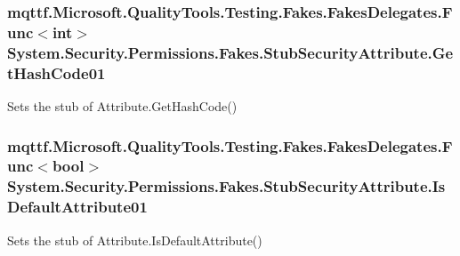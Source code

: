 \hypertarget{class_system_1_1_security_1_1_permissions_1_1_fakes_1_1_stub_security_attribute_a25960f180eac8b4bc3a213422d990975}{
\subsubsection[{Get\-Hash\-Code01}]{\setlength{\rightskip}{0pt plus 5cm}mqttf.\-Microsoft.\-Quality\-Tools.\-Testing.\-Fakes.\-Fakes\-Delegates.\-Func$<$int$>$ System.\-Security.\-Permissions.\-Fakes.\-Stub\-Security\-Attribute.\-Get\-Hash\-Code01}}\label{class_system_1_1_security_1_1_permissions_1_1_fakes_1_1_stub_security_attribute_a25960f180eac8b4bc3a213422d990975}


Sets the stub of Attribute.\-Get\-Hash\-Code()

\hypertarget{class_system_1_1_security_1_1_permissions_1_1_fakes_1_1_stub_security_attribute_a6dbdb946d459fad9a2d0c2ef800268ab}{
\subsubsection[{Is\-Default\-Attribute01}]{\setlength{\rightskip}{0pt plus 5cm}mqttf.\-Microsoft.\-Quality\-Tools.\-Testing.\-Fakes.\-Fakes\-Delegates.\-Func$<$bool$>$ System.\-Security.\-Permissions.\-Fakes.\-Stub\-Security\-Attribute.\-Is\-Default\-Attribute01}}\label{class_system_1_1_security_1_1_permissions_1_1_fakes_1_1_stub_security_attribute_a6dbdb946d459fad9a2d0c2ef800268ab}


Sets the stub of Attribute.\-Is\-Default\-Attribute()

